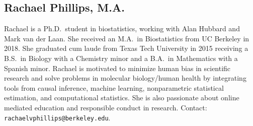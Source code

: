 \documentclass[a4paper,11pt]{texMemo}
\begin{document}
\vspace{-.5em}

\subsection*{Rachael Phillips, M.A.}

\vspace{-.5em}

Rachael is a Ph.D.~student in biostatistics, working with Alan Hubbard and Mark
van der Laan. She received an M.A.~in Biostatistics from UC Berkeley in 2018.
She graduated cum laude from Texas Tech University in 2015 receiving a B.S.~in
Biology with a Chemistry minor and a B.A.~in Mathematics with a Spanish minor.
Rachael is motivated to minimize human bias in scientific research and solve
problems in molecular biology/human health by integrating tools from causal
inference, machine learning, nonparametric statistical estimation, and
computational statistics. She is also passionate about online mediated education
and responsible conduct in research. Contact:
\texttt{rachaelvphillips@berkeley.edu}.
\end{document}

